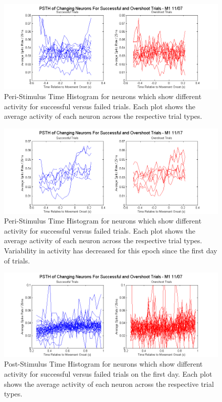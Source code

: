 \documentclass[11pt,a4paper]{article}
\begin{document}
\begin{figure}[h]
\includegraphics[width=\textwidth]{psth-s-f21-m1-07-pre}
\caption{Peri-Stimulus Time Histogram for neurons which show different activity for successful versus failed trials. Each plot shows the average activity of each neuron across the respective trial types.}\label{plot:psth-07-pre}
\end{figure}
\begin{figure}
\includegraphics[width=\textwidth]{psth-s-f21-m1-17-pre}
\caption{Peri-Stimulus Time Histogram for neurons which show different activity for successful versus failed trials. Each plot shows the average activity of each neuron across the respective trial types. Variability in activity has decreased for this epoch since the first day of trials.}\label{plot:psth-17-pre}
\end{figure}
\begin{figure}[h]
\includegraphics[width=\textwidth]{psth-s-f21-m1-07-pos}
\caption{Post-Stimulus Time Histogram for neurons which show different activity for successful versus failed trials on the first day. Each plot shows the average activity of each neuron across the respective trial types.}\label{plot:psth-07-pos}
\end{figure}
\end{document}
